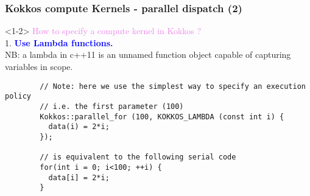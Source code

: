 \begin{frame}[fragile]
  \frametitle{Kokkos compute Kernels - parallel dispatch (2)}

  \begin{onlyenv}<1-2>
    {\large \textcolor{violet}{How to specify a compute kernel in Kokkos ?}}\\
    {\large 1. \textcolor{blue}{\textbf{Use Lambda functions.}}}\\
    NB: a lambda in c++11 is an unnamed function object capable of capturing variables in scope.
    {\small
      \begin{verbatim}
        // Note: here we use the simplest way to specify an execution policy
        // i.e. the first parameter (100)
        Kokkos::parallel_for (100, KOKKOS_LAMBDA (const int i) {
          data(i) = 2*i;
        });

        // is equivalent to the following serial code
        for(int i = 0; i<100; ++i) {
          data[i] = 2*i;
        }
      \end{verbatim}
    }
  \end{onlyenv}

\end{frame}

